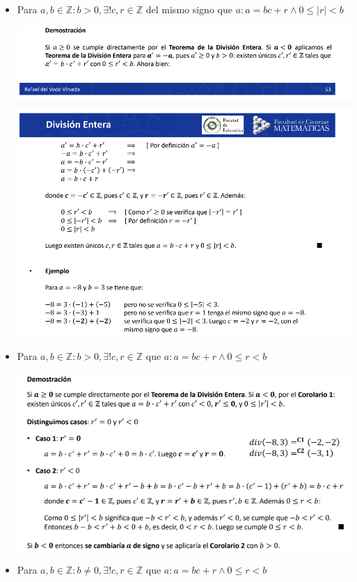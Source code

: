 \documentclass[10pt,a4paper,openright]{book}
\begin{document}
\begin{itemize}

\item Para $a,b\in \mathbb Z : b>0, \exists! c,r\in \mathbb Z$ del mismo signo que $a:a=bc+r\wedge 0\leq |r|<b$
\begin{center}
\includegraphics[scale=0.5]{corolario 1}
\end{center}

\item Para $a,b\in \mathbb Z : b>0, \exists! c,r\in \mathbb Z$ que $a:a=bc+r\wedge 0\leq r<b$
\begin{center}
\includegraphics[scale=0.55]{corolario 2}
\end{center}

\item Para $a,b\in \mathbb Z : b\neq 0, \exists! c,r\in \mathbb Z$ que $a:a=bc+r\wedge 0\leq r<b$
\end{itemize}
\end{document}
